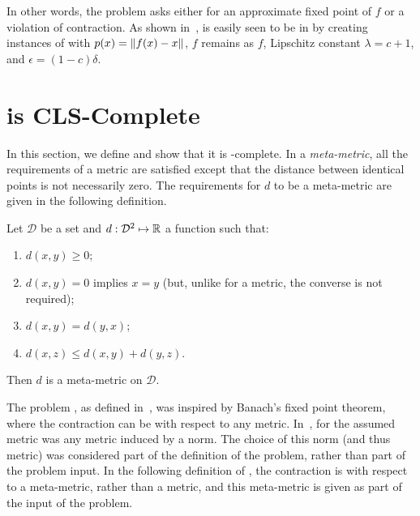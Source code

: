 In other words, the problem asks either for an approximate fixed point of $f$ or
a violation of contraction. As shown in~\cite{daskalakis2011continuous}, \CM is
easily seen to be in \CLS by creating instances of \CLO with $p(x) =
\left\| f(x)-x \right\|$, $f$ remains as $f$, Lipschitz constant $\lambda = c+1$, and $\epsilon =
(1-c)\delta$.

\section{\MMCM is CLS-Complete}
\label{sec:MMCMisCLScomplete}

In this section, we define \MMCM and show that it is \CLS-complete.
In a \emph{meta-metric}, all the requirements of a metric are satisfied except
that the distance between identical points is not necessarily zero. The
requirements for $d$ to be a meta-metric are given in the following definition.

\begin{definition}
\label{def:metametric}
Let $\mathcal{D}$ be a set and $d:\mathcal{D}^2 \mapsto \mathbb{R}$ a function such that:
\begin{enumerate}
\item $d(x, y) \ge 0$;
\item $d(x, y) = 0$ implies $x = y$ (but, unlike for a metric, the converse is not required);
\item $d(x, y) = d(y, x)$;
\item $d(x, z) \le d(x, y) + d(y, z)$.
\end{enumerate}
Then $d$ is a meta-metric on $\mathcal{D}$.
\end{definition}

The problem \CM, as defined in~\cite{daskalakis2011continuous}, was inspired by
Banach's fixed point theorem, where the contraction can be with respect to any
metric.  In~\cite{daskalakis2011continuous}, for \CM the assumed metric was any
metric induced by a norm. The choice of this norm (and thus metric) was
considered part of the definition of the problem, rather than part of the
problem input. In the following definition of \MMCM, the contraction is with
respect to a meta-metric, rather than a metric, and this meta-metric is given as part of the input of
the problem.

